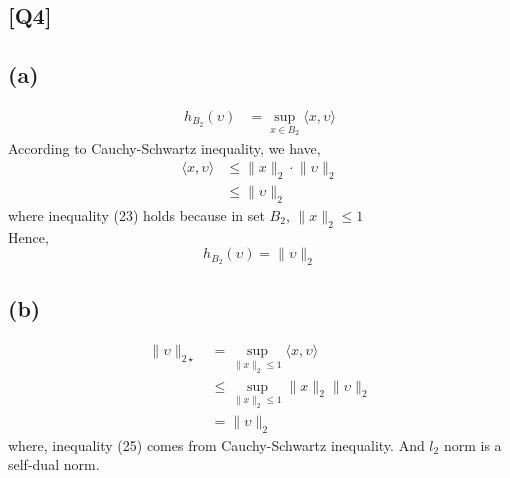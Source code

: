\documentclass[12pt, a4 paper]{article}
\begin{document}
    \begin{framed}
        \section{[Q4]}
        \subsection{(a)}
        \begin{align}
            h_{B_{2}} (\upsilon) &= \sup\limits_{x \in B_{2}} \langle  x, \upsilon \rangle
        \end{align}
        \indent According to Cauchy-Schwartz inequality, we have,
        \begin{align}
            \langle  x, \upsilon \rangle &\leq \lVert x \rVert_{2} \cdot 
            \lVert \upsilon \rVert_{2} \\
            &\leq \lVert \upsilon \rVert_{2}
        \end{align}
        \indent where inequality (23) holds because in set $B_{2}$, $\lVert x 
        \rVert_{2} \leq 1$\\
        \indent Hence,
        $$
        h_{B_{2}} (\upsilon) = \lVert \upsilon \rVert_{2}
        $$

        \subsection{(b)}
        \begin{align}
            \lVert \upsilon \rVert_{2\star} &= 
            \sup\limits_{\lVert x \rVert_{2} \leq 1}  \langle x, \upsilon \rangle\\
            &\leq \sup\limits_{\lVert x \rVert_{2} \leq 1} \lVert x \rVert_{2}
            \lVert \upsilon \rVert_{2} \\
            &= \lVert \upsilon \rVert_{2}
        \end{align}
        \indent where, inequality (25) comes from Cauchy-Schwartz inequality. And $l_{2}$
        norm is a self-dual norm.


\end{framed}
\end{document}
